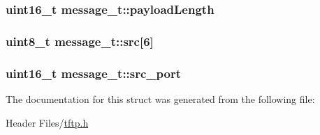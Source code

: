 \hypertarget{structmessage__t_ac49e1df59afca01e0f2cef436ef00359}{
\subsubsection[{payload\-Length}]{\setlength{\rightskip}{0pt plus 5cm}uint16\-\_\-t {\bf message\-\_\-t\-::payload\-Length}}}\label{structmessage__t_ac49e1df59afca01e0f2cef436ef00359}
\hypertarget{structmessage__t_ac8f22051bbe97a235c19698e9705c362}{
\subsubsection[{src}]{\setlength{\rightskip}{0pt plus 5cm}uint8\-\_\-t {\bf message\-\_\-t\-::src}\mbox{[}6\mbox{]}}}\label{structmessage__t_ac8f22051bbe97a235c19698e9705c362}
\hypertarget{structmessage__t_ae11b6a0645157c8c75790f7c541fcaed}{
\subsubsection[{src\-\_\-port}]{\setlength{\rightskip}{0pt plus 5cm}uint16\-\_\-t {\bf message\-\_\-t\-::src\-\_\-port}}}\label{structmessage__t_ae11b6a0645157c8c75790f7c541fcaed}


\-The documentation for this struct was generated from the following file\-:\begin{DoxyCompactItemize}
\item 
\-Header Files/\hyperlink{tftp_8h}{tftp.\-h}\end{DoxyCompactItemize}
